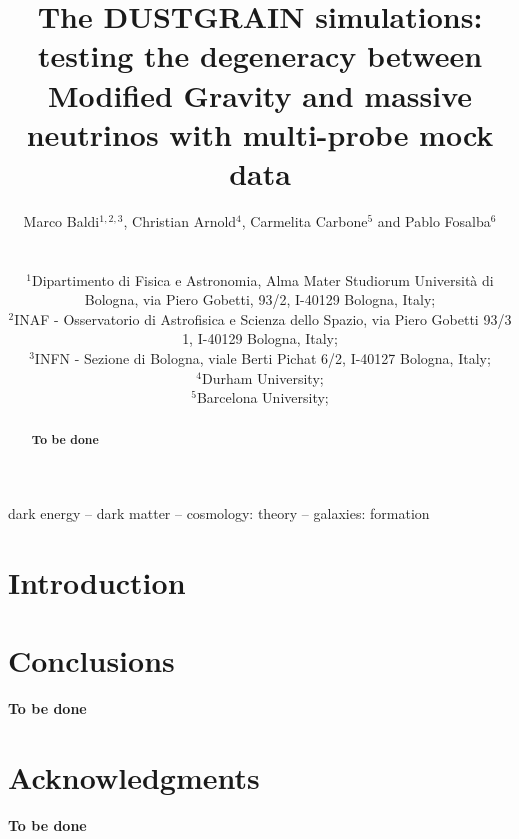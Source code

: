 \documentclass[useAMS,usenatbib]{mnras}
\title[]{The {DUSTGRAIN} simulations: testing the degeneracy between Modified Gravity and massive neutrinos with multi-probe mock data}
\author[M.~Baldi, C.~Arnold, C.~Carbone P.~Fosalba]{\parbox{\textwidth}{Marco Baldi$^{1,2,3}$, Christian Arnold$^{4}$, Carmelita Carbone$^{5}$ and Pablo Fosalba$^{6}$}
\\
\\$^{1}$Dipartimento di Fisica e Astronomia, Alma Mater Studiorum Universit\`a di Bologna, via Piero Gobetti, 93/2, I-40129 Bologna, Italy;
\\$^{2}$INAF - Osservatorio di Astrofisica e Scienza dello Spazio, via Piero Gobetti 93/3 1, I-40129 Bologna, Italy;
\\$^{3}$INFN - Sezione di Bologna, viale Berti Pichat 6/2, I-40127 Bologna, Italy;
\\$^{4}$Durham University;
\\$^{5}$Barcelona University;
}
\begin{document}
\pagerange{\pageref{firstpage}--\pageref{lastpage}} 
\maketitle
\label{firstpage}
\begin{abstract}	
{\bf To be done}
\end{abstract}

\begin{keywords}
dark energy -- dark matter --  cosmology: theory -- galaxies: formation
\end{keywords}


\section{Introduction}
\label{i}



\section{Conclusions}
\label{concl}

{\bf To be done}



\section*{Acknowledgments}
{\bf To be done}




\end{document}
